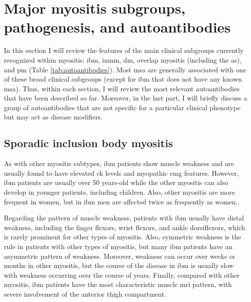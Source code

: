 \section{Major myositis subgroups, pathogenesis, and autoantibodies}

In this section I will review the features of the main clinical subgroups currently recognized within myositis: \gls{ibm}, \gls{imnm}, \gls{dm}, overlap myositis (including the \gls{as}), and \gls{pm} (Table \ref{tab:autoantibodies}). Most \gls{msa} are generally associated with one of these broad clinical subgroups (except for \gls{ibm} that does not have any known \gls{msa}). Thus, within each section, I will review the most relevant autoantibodies that have been described so far. Moreover, in the last part, I will briefly discuss a group of autoantibodies that are not specific for a particular clinical phenotype but may act as disease modifiers.

\subsection{Sporadic inclusion body myositis}

As with other myositis subtypes, \gls{ibm} patients show muscle weakness and are usually found to have elevated \gls{ck} levels and myopathic \gls{emg} features. However, \gls{ibm} patients are usually over 50 years-old while the other myositis can also develop in younger patients, including children.\cite{SelvaOCallaghan2018} Also, other myositis are more frequent in women, but in \gls{ibm} men are affected twice as frequently as women.\cite{SelvaOCallaghan2018}.

Regarding the pattern of muscle weakness, patients with \gls{ibm} usually have distal weakness, including the finger flexors, wrist flexors, and ankle dorsiflexors, which is rarely prominent for other types of myositis.\cite{Lloyd2014,SelvaOCallaghan2018} Also, symmetric weakness is the rule in patients with other types of myositis, but many \gls{ibm} patients have an asymmetric pattern of weakness.\cite{SelvaOCallaghan2018} Moreover, weakness can occur over weeks or months in other myositis, but the course of the disease in \gls{ibm} is usually slow with weakness occurring over the course of years.\cite{SelvaOCallaghan2018} Finally, compared with other myositis, \gls{ibm} patients have the most characteristic muscle \gls{mri} pattern, with severe involvement of the anterior thigh compartment.\cite{Tasca2015,PinalFernandez2017}

